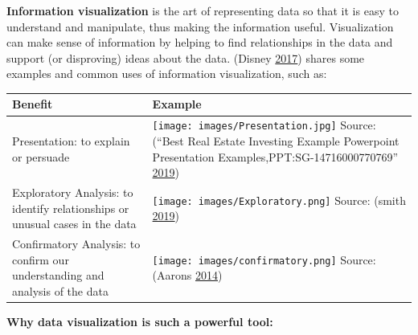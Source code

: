 \documentclass[]{book}
\begin{document}
\textbf{Information visualization} is the art of representing data so that it is easy to understand and manipulate, thus making the information useful. Visualization can make sense of information by helping to find relationships in the data and support (or disproving) ideas about the data. (Disney \protect\hyperlink{ref-lawfraud}{2017}) shares some examples and common uses of information visualization, such as:

\begin{longtable}[]{@{}ll@{}}
\toprule
\begin{minipage}[b]{0.40\columnwidth}\raggedright
Benefit\strut
\end{minipage} & \begin{minipage}[b]{0.54\columnwidth}\raggedright
Example\strut
\end{minipage}\tabularnewline
\midrule
\endhead
\begin{minipage}[t]{0.40\columnwidth}\raggedright
Presentation: to explain or persuade\strut
\end{minipage} & \begin{minipage}[t]{0.54\columnwidth}\raggedright
\texttt{[image: images/Presentation.jpg]} Source: (``Best Real Estate Investing Example Powerpoint Presentation Examples,PPT:SG-14716000770769'' \protect\hyperlink{ref-slide_geeks}{2019})\strut
\end{minipage}\tabularnewline
\begin{minipage}[t]{0.40\columnwidth}\raggedright
Exploratory Analysis: to identify relationships or unusual cases in the data\strut
\end{minipage} & \begin{minipage}[t]{0.54\columnwidth}\raggedright
\texttt{[image: images/Exploratory.png]} Source: (smith \protect\hyperlink{ref-david_2019}{2019})\strut
\end{minipage}\tabularnewline
\begin{minipage}[t]{0.40\columnwidth}\raggedright
Confirmatory Analysis: to confirm our understanding and analysis of the data\strut
\end{minipage} & \begin{minipage}[t]{0.54\columnwidth}\raggedright
\texttt{[image: images/confirmatory.png]} Source: (Aarons \protect\hyperlink{ref-aarons_2014}{2014})\strut
\end{minipage}\tabularnewline
\bottomrule
\end{longtable}

\textbf{Why data visualization is such a powerful tool:}
\end{document}
